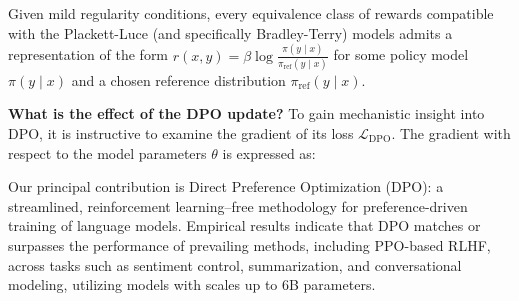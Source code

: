 \begin{theorem}\label{thm:main}
    Given mild regularity conditions, every equivalence class of rewards compatible with the Plackett-Luce (and specifically Bradley-Terry) models admits a representation of the form ${r(x, y) = \beta \log \frac{\pi(y\mid x)}{\pi_\text{ref}(y\mid x)}}$ for some policy model $\pi(y\mid x)$ and a chosen reference distribution $\pi_\text{ref}(y \mid x)$.
\end{theorem}

\textbf{What is the effect of the DPO update?} To gain mechanistic insight into DPO, it is instructive to examine the gradient of its loss $\mathcal{L}_\text{DPO}$. The gradient with respect to the model parameters $\theta$ is expressed as:

Our principal contribution is Direct Preference Optimization (DPO): a streamlined, reinforcement learning–free methodology for preference-driven training of language models. Empirical results indicate that DPO matches or surpasses the performance of prevailing methods, including PPO-based RLHF, across tasks such as sentiment control, summarization, and conversational modeling, utilizing models with scales up to 6B parameters.

